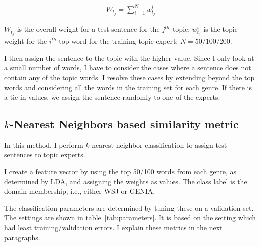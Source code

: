 \begin{align}
    W_{t_j} = \sum_{i=1}^{N} w_{t_j}^{i}
\end{align}

$W_{t_j}$ is the overall weight for a test sentence for the $j^{th}$ topic; $w_{t_j}^{i}$ is the topic weight for the $i^{th}$ top word for the training topic expert; $N = 50/100/200$.

I then assign the sentence to the topic with the higher value. Since I only look at a small number of words, I have to consider the cases where a sentence does not contain any of the topic words. I resolve these cases by extending beyond the top  words and considering all the words in the training set for each genre. If there is a tie in values, we assign the sentence randomly to one of the experts. %




\subsection{$k$-Nearest Neighbors based similarity metric}

In this method, I perform $k$-nearest neighbor classification to assign test sentences to topic experts. 


I create a feature vector by using the top 50/100 words from each genre, as determined by LDA, and assigning the weights as values. The class label is the domain-membership, i.e., either WSJ or GENIA.

The classification parameters are determined by tuning these on a validation set. The settings are shown in table~\ref{tab:parameters}. It is based on the setting which had least training/validation errors. I explain these metrics in the next paragraphs.

